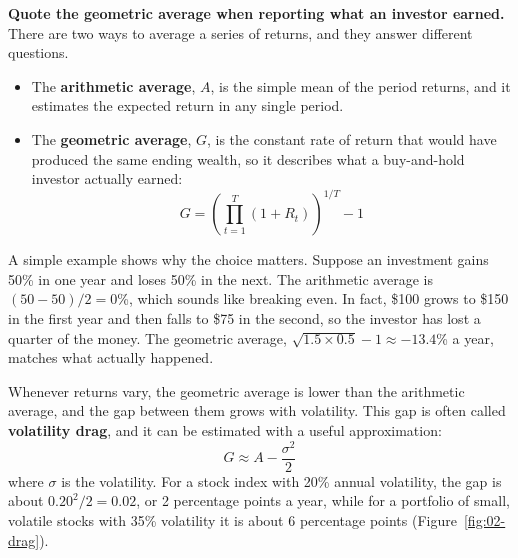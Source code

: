 \textbf{Quote the geometric average when reporting what an investor earned.} There are two ways to average a series of returns, and they answer different questions.

\begin{itemize}
  \item The \textbf{arithmetic average}, $A$, is the simple mean of the period returns, and it estimates the expected return in any single period.
  \item The \textbf{geometric average}, $G$, is the constant rate of return that would have produced the same ending wealth, so it describes what a buy-and-hold investor actually earned:
  \begin{equation}
    G = \left(\prod_{t=1}^{T} (1 + R_t)\right)^{1/T} - 1
    \label{eq:02-geometric}
  \end{equation}
\end{itemize}

A simple example shows why the choice matters. Suppose an investment gains 50\% in one year and loses 50\% in the next. The arithmetic average is $(50 - 50)/2 = 0$\%, which sounds like breaking even. In fact, \$100 grows to \$150 in the first year and then falls to \$75 in the second, so the investor has lost a quarter of the money. The geometric average, $\sqrt{1.5 \times 0.5} - 1 \approx -13.4$\% a year, matches what actually happened.

Whenever returns vary, the geometric average is lower than the arithmetic average, and the gap between them grows with volatility. This gap is often called \textbf{volatility drag}, and it can be estimated with a useful approximation:
\begin{equation}
  G \approx A - \frac{\sigma^2}{2}
  \label{eq:02-drag}
\end{equation}
where $\sigma$ is the volatility. For a stock index with 20\% annual volatility, the gap is about $0.20^2/2 = 0.02$, or 2 percentage points a year, while for a portfolio of small, volatile stocks with 35\% volatility it is about 6 percentage points (Figure~\ref{fig:02-drag}).




